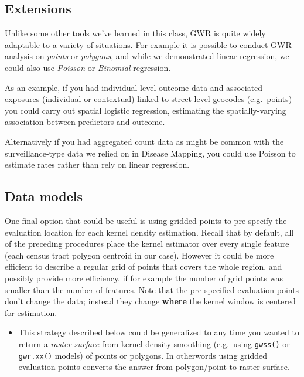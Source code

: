 \documentclass[
]{book}
\newcommand{\passthrough}[1]{#1}
\newenvironment{rmdblock}[1]
  {%
  \begin{itemize}
  \renewcommand{\labelitemi}{
    \raisebox{-.7\height}[0pt][0pt]{
      {\setkeys{Gin}{width=3em,keepaspectratio}\texttt{[image: images/\#1]}}
    }
  }
  \item
  }
  {
  \end{itemize}
  }
\newenvironment{rmdnote}
  {\begin{rmdblock}{note}}
  {\end{rmdblock}}
\begin{document}
\hypertarget{extensions}{%
\subsection{Extensions}\label{extensions}}

Unlike some other tools we've learned in this class, GWR is quite widely adaptable to a variety of situations. For example it is possible to conduct GWR analysis on \emph{points} or \emph{polygons}, and while we demonstrated linear regression, we could also use \emph{Poisson} or \emph{Binomial} regression.

As an example, if you had individual level outcome data and associated exposures (individual or contextual) linked to street-level geocodes (e.g.~points) you could carry out spatial logistic regression, estimating the spatially-varying association between predictors and outcome.

Alternatively if you had aggregated count data as might be common with the surveillance-type data we relied on in Disease Mapping, you could use Poisson to estimate rates rather than rely on linear regression.

\hypertarget{data-models}{%
\subsection{Data models}\label{data-models}}

One final option that could be useful is using gridded points to pre-specify the evaluation location for each kernel density estimation. Recall that by default, all of the preceding procedures place the kernel estimator over every single feature (each census tract polygon centroid in our case). However it could be more efficient to describe a regular grid of points that covers the whole region, and possibly provide more efficiency, if for example the number of grid points was smaller than the number of features. Note that the pre-specified evaluation points don't change the data; instead they change \textbf{where} the kernel window is centered for estimation.

\begin{rmdnote}
This strategy described below could be generalized to any time you wanted to return a \emph{raster surface} from kernel density smoothing (e.g.~using \passthrough{\lstinline!gwss()!} or \passthrough{\lstinline!gwr.xx()!} models) of points or polygons. In otherwords using gridded evaluation points converts the answer from polygon/point to raster surface.
\end{rmdnote}
\end{document}
